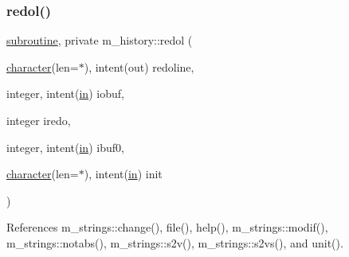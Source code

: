 \subsubsection{\texorpdfstring{redol()}{redol()}}
{\footnotesize\ttfamily \hyperlink{M__stopwatch_83_8txt_acfbcff50169d691ff02d4a123ed70482}{subroutine}, private m\+\_\+history\+::redol (\begin{DoxyParamCaption}\item[{\hyperlink{option__stopwatch_83_8txt_abd4b21fbbd175834027b5224bfe97e66}{character}(len=$\ast$), intent(out)}]{redoline,  }\item[{integer, intent(\hyperlink{M__journal_83_8txt_afce72651d1eed785a2132bee863b2f38}{in})}]{iobuf,  }\item[{integer}]{iredo,  }\item[{integer, intent(\hyperlink{M__journal_83_8txt_afce72651d1eed785a2132bee863b2f38}{in})}]{ibuf0,  }\item[{\hyperlink{option__stopwatch_83_8txt_abd4b21fbbd175834027b5224bfe97e66}{character}(len=$\ast$), intent(\hyperlink{M__journal_83_8txt_afce72651d1eed785a2132bee863b2f38}{in})}]{init }\end{DoxyParamCaption})\hspace{0.3cm}{\ttfamily [private]}}



References m\+\_\+strings\+::change(), file(), help(), m\+\_\+strings\+::modif(), m\+\_\+strings\+::notabs(), m\+\_\+strings\+::s2v(), m\+\_\+strings\+::s2vs(), and unit().

